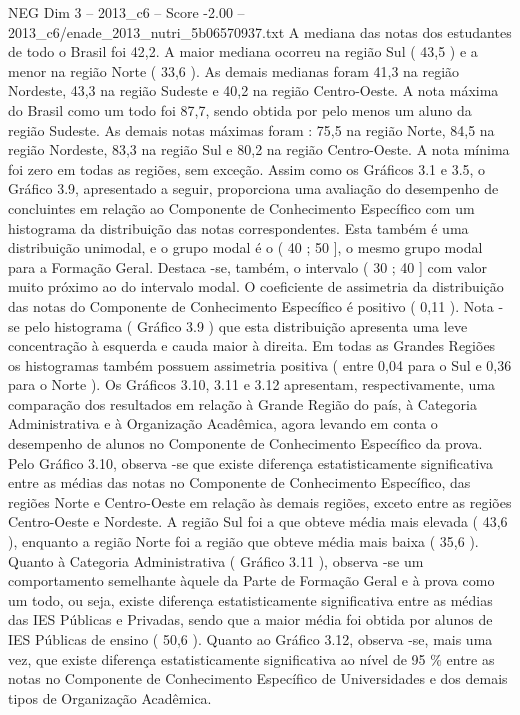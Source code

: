 \begin{textsample}{NEG Dim 3 – 2013\_c6 – Score -2.00 – 2013\_c6/enade\_2013\_nutri\_5b06570937.txt}
A mediana das notas dos estudantes de todo o Brasil foi 42,2.
A maior mediana ocorreu na região Sul ( 43,5 ) e a menor na região Norte ( 33,6 ).
As demais medianas foram 41,3 na região Nordeste, 43,3 na região Sudeste e 40,2 na região Centro-Oeste.
A nota máxima do Brasil como um todo foi 87,7, sendo obtida por pelo menos um aluno da região Sudeste.
As demais notas máximas foram : 75,5 na região Norte, 84,5 na região Nordeste, 83,3 na região Sul e 80,2 na região Centro-Oeste.
A nota mínima foi zero em todas as regiões, sem exceção.
Assim como os Gráficos 3.1 e 3.5, o Gráfico 3.9, apresentado a seguir, proporciona uma avaliação do desempenho de concluintes em relação ao Componente de Conhecimento Específico com um histograma da distribuição das notas correspondentes.
Esta também é uma distribuição unimodal, e o grupo modal é o ( 40 ; 50 ], o mesmo grupo modal para a Formação Geral.
Destaca -se, também, o intervalo ( 30 ; 40 ] com valor muito próximo ao do intervalo modal.
O coeficiente de assimetria da distribuição das notas do Componente de Conhecimento Específico é positivo ( 0,11 ).
Nota -se pelo histograma ( Gráfico 3.9 ) que esta distribuição apresenta uma leve concentração à esquerda e cauda maior à direita.
Em todas as Grandes Regiões os histogramas também possuem assimetria positiva ( entre 0,04 para o Sul e 0,36 para o Norte ).
Os Gráficos 3.10, 3.11 e 3.12 apresentam, respectivamente, uma comparação dos resultados em relação à Grande Região do país, à Categoria Administrativa e à Organização Acadêmica, agora levando em conta o desempenho de alunos no Componente de Conhecimento Específico da prova.
Pelo Gráfico 3.10, observa -se que existe diferença estatisticamente significativa entre as médias das notas no Componente de Conhecimento Específico, das regiões Norte e Centro-Oeste em relação às demais regiões, exceto entre as regiões Centro-Oeste e Nordeste.
A região Sul foi a que obteve média mais elevada ( 43,6 ), enquanto a região Norte foi a região que obteve média mais baixa ( 35,6 ).
Quanto à Categoria Administrativa ( Gráfico 3.11 ), observa -se um comportamento semelhante àquele da Parte de Formação Geral e à prova como um todo, ou seja, existe diferença estatisticamente significativa entre as médias das IES Públicas e Privadas, sendo que a maior média foi obtida por alunos de IES Públicas de ensino ( 50,6 ).
Quanto ao Gráfico 3.12, observa -se, mais uma vez, que existe diferença estatisticamente significativa ao nível de 95 \% entre as notas no Componente de Conhecimento Específico de Universidades e dos demais tipos de Organização Acadêmica.

\end{textsample}
